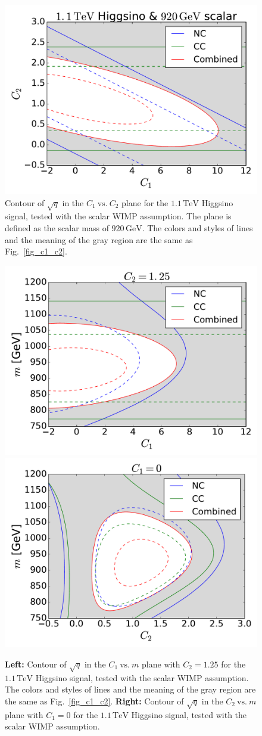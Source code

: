 \documentclass[12pt,twoside,book]{article}
\begin{document}
\begin{figure}[t]
  \centering
  \includegraphics[width=0.5\linewidth]{C1_vs_C2_Higgsino_scalar.pdf}
  \caption{
    Contour of $\sqrt{q}$ in the $C_1~\mathrm{vs.}~C_2$ plane for the $1.1\,\mathrm{TeV}$ Higgsino signal, tested with the scalar WIMP assumption.
    The plane is defined as the scalar mass of $920\,\mathrm{GeV}$.
    The colors and styles of lines and the meaning of the gray region are the same as Fig.~\ref{fig_c1_c2}.
  }
  \label{fig_c1_c2_scalar}
\end{figure}

\begin{figure}[t]
  \centering
  \includegraphics[width=0.48\linewidth]{C1_vs_mass_Higgsino_scalar.pdf}
  \includegraphics[width=0.48\linewidth]{C2_vs_mass_Higgsino_scalar.pdf}
  \caption{
    \textbf{Left:} Contour of $\sqrt{q}$ in the $C_1~\mathrm{vs.}~m$ plane with $C_2 = 1.25$ for the $1.1\,\mathrm{TeV}$ Higgsino signal, tested with the scalar WIMP assumption.
    The colors and styles of lines and the meaning of the gray region are the same as Fig.~\ref{fig_c1_c2}.
    \textbf{Right:} Contour  of $\sqrt{q}$ in the $C_2~\mathrm{vs.}~m$ plane with $C_1 = 0$ for the $1.1\,\mathrm{TeV}$ Higgsino signal, tested with the scalar WIMP assumption.
  }
  \label{fig_c1_m_scalar}
\end{figure}
\end{document}
